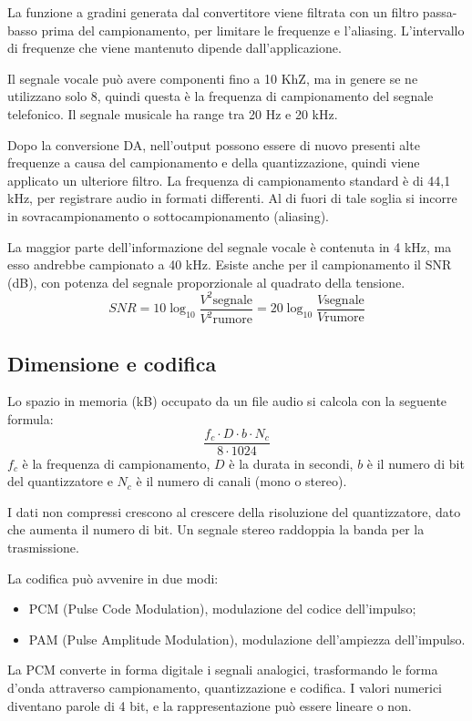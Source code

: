 La funzione a gradini generata dal convertitore viene filtrata con un filtro passa-basso prima del campionamento, per limitare le frequenze e l'aliasing. L'intervallo di frequenze che viene mantenuto dipende dall'applicazione.

Il segnale vocale può avere componenti fino a 10 KhZ, ma in genere se ne utilizzano solo 8, quindi questa è la frequenza di campionamento del segnale telefonico. Il segnale musicale ha range tra 20 Hz e 20 kHz.

Dopo la conversione DA, nell'output possono essere di nuovo presenti alte frequenze a causa del campionamento e della quantizzazione, quindi viene applicato un ulteriore filtro. La frequenza di campionamento standard è di 44,1 kHz, per registrare audio in formati differenti. Al di fuori di tale soglia si incorre in sovracampionamento o sottocampionamento (aliasing). 

La maggior parte dell'informazione del segnale vocale è contenuta in 4 kHz, ma esso andrebbe campionato a 40 kHz. Esiste anche per il campionamento il SNR (dB), con potenza del segnale proporzionale al quadrato della tensione.
$$SNR = 10\log_{10} \frac{V^2\text{segnale}}{V^2\text{rumore}} = 20\log_{10} \frac{V\text{segnale}}{V\text{rumore}}$$

\subsection{Dimensione e codifica}
Lo spazio in memoria (kB) occupato da un file audio si calcola con la seguente formula:
$$\frac{f_c \cdot D \cdot b \cdot N_c}{8 \cdot 1024}$$
$f_c$ è la frequenza di campionamento, $D$ è la durata in secondi, $b$ è il numero di bit del quantizzatore e $N_c$ è il numero di canali (mono o stereo).

I dati non compressi crescono al crescere della risoluzione del quantizzatore, dato che aumenta il numero di bit. Un segnale stereo raddoppia la banda per la trasmissione. 

La codifica può avvenire in due modi:
\begin{itemize}
	\item PCM (Pulse Code Modulation), modulazione del codice dell'impulso;
	\item PAM (Pulse Amplitude Modulation), modulazione dell'ampiezza dell'impulso.
\end{itemize}

La PCM converte in forma digitale i segnali analogici, trasformando le forma d'onda attraverso campionamento, quantizzazione e codifica. I valori numerici diventano parole di 4 bit, e la rappresentazione può essere lineare o non.

